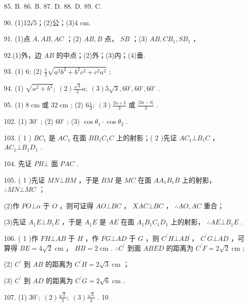 \documentclass[10pt]{article}
\begin{document}
85. B. 86. B. 87. D. 88. D. 89. C.

90. (1)12√5；(2)公；(3)4 cm.

91. (1)点 \(A,{AB},{AC}\) ；(2) \({AB},B\) 点， \({SB}\) ；(3) \({AB},C{B}_{1},S{B}_{1}\) ，

92.(1)外，边 \({AB}\) 的中点；(2)外；(3)内；(4)垂.

93. (1) 6; (2) \(\frac{1}{2}\sqrt{{a}^{2}{b}^{2} + {b}^{2}{c}^{2} + {c}^{2}{a}^{2}}\) ;

94. (1) \(\sqrt{{a}^{2} + {b}^{2}};\;\left( 2\right) \frac{\sqrt{3}}{3}a;\;\left( 3\right) 5\sqrt{3},{60}^{ \circ  },{60}^{ \circ  },{60}^{ \circ  }\) .

95. (1) \(8\mathrm{\;{cm}}\) 或 \({32}\mathrm{\;{cm}}\) ; (2) \(6\frac{1}{3};\;\left( 3\right) \frac{{2a} + b}{3}\) 或 \(\frac{\left| 2a - b\right| }{3}\) .

102. (1) \({30}^{ \circ  }\) ; (2) \({60}^{ \circ  }\) ; (3) \(\cos {\theta }_{1} \cdot  \cos {\theta }_{2}\) .

103. ( 1 ) \(B{C}_{1}\) 是 \(A{C}_{1}\) 在面 \(B{B}_{1}{C}_{1}C\) 上的射影；( 2 )先证 \(A{C}_{1} \bot  {B}_{1}C\) ， \(A{C}_{1} \bot  {B}_{1}{D}_{1}\) .

104. 先证 \({PB} \bot\) 面 \({PAC}\) .

105. ( 1 )先证 \({MN} \bot  {BM}\) ，于是 \({BM}\) 是 \({MC}\) 在面 \(A{A}_{1}{B}_{1}B\) 上的射影， \(\therefore {MN} \bot  {MC}\) ；

(2)作 \({PO} \bot  \alpha\) 于 \(O\) ，则可证得 \({{AO} \bot  {BC}}\) ， \({X {AC} \bot  {BC}}\) ， \(\therefore {AO},{AC}\) 重合；

(3)先证 \({A}_{1}E \bot  {B}_{1}E\) ，于是 \({A}_{1}E\) 是 \({AE}\) 在面 \({A}_{1}{B}_{1}{C}_{1}{D}_{1}\) 上的射影， \(\therefore {AE}\bot {B}_{1}E\) .

106. ( 1 )作 \({FH} \bot  {AB}\) 于 \(H\) ，作 \({FG} \bot  {AD}\) 于 \(G\) ，则 \({C}^{\prime }H \bot  {AB}\) ， \({C}^{\prime }G \bot  {AD}\) ，可算得 \({BE} = {4\sqrt{2}}\mathrm{\;{cm}}\) ， \({HB} = 2\mathrm{\;{cm}}\) . \(\therefore {C}^{\prime }\) 到面 \({ABED}\) 的距离为 \({C}^{\prime }F = 2\sqrt{2}\mathrm{\;{cm}}\) ;

(2) \({C}^{\prime }\) 到 \({AB}\) 的距离为 \({C}^{\prime }H = 2\sqrt{3}\mathrm{\;{cm}}\) ；

(3) \({C}^{\prime }\) 到 \({AD}\) 的距离为 \({C}^{\prime }G = 2\sqrt{6}\mathrm{\;{cm}}\) .

107. (1) \({30}^{ \circ  };\;\left( 2\right) \frac{\sqrt{2}}{3};\;\left( 3\right) \frac{\sqrt{3}}{3}\) . 10
\end{document}
